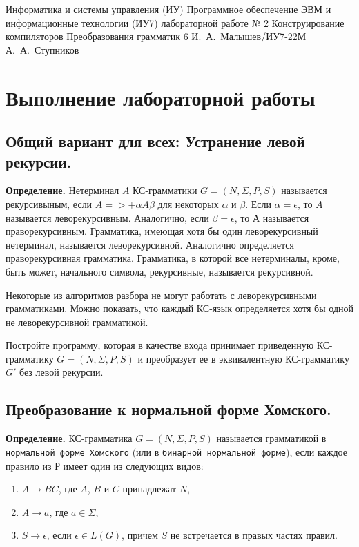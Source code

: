\documentclass[a4paper]{bmstu}
\begin{document}
\makereporttitle
{Информатика и системы управления (ИУ)}
{Программное обеспечение ЭВМ и информационные технологии (ИУ7)}
{лабораторной работе № 2}
{Конструирование компиляторов}
{Преобразования грамматик}
{6}
{И.~А.~Малышев/ИУ7-22М}
{А.~А.~Ступников}


\setcounter{page}{2}


\chapter{Выполнение лабораторной работы}

\section{Общий вариант для всех: Устранение левой рекурсии.}

\textbf{Определение.} Нетерминал $A$ КС-грамматики $G = (N, \Sigma, P, S)$ называется рекурсивыным, если $A =>+ \alpha A \beta$ для некоторых $\alpha$ и $\beta$. Если $\alpha = \epsilon$, то $A$ называется леворекурсивным. Аналогично, если $\beta = \epsilon$, то $А$ называется праворекурсивным. Грамматика, имеющая хотя бы один леворекурсивный нетерминал, называется леворекурсивной. Аналогично определяется праворекурсивная грамматика. Грамматика, в которой все нетерминалы, кроме, быть может, начального символа, рекурсивные, называется рекурсивной.

Некоторые из алгоритмов разбора не могут работать с леворекурсивными грамматиками. Можно показать, что каждый КС-язык определяется хотя бы одной не леворекурсивной грамматикой.

Постройте программу, которая в качестве входа принимает приведенную КС-грамматику $G = (N, \Sigma, P, S)$ и преобразует ее в эквивалентную КС-грамматику $G'$ без левой рекурсии.

\section{Преобразование к нормальной форме Хомского.}

\textbf{Определение.} КС-грамматика $G = (N, \Sigma, P, S)$ называется грамматикой в \texttt{нормальной форме Хомского} (или в \texttt{бинарной нормальной форме}), если каждое правило из $Р$ имеет один из следующих видов:
\begin{enumerate}
    \item $A \rightarrow BC$, где $A$, $B$ и $C$ принадлежат $N$,
    \item $A \rightarrow a$, где $a \in \Sigma$,
    \item $S \rightarrow \epsilon$, если $\epsilon \in L(G)$, причем $S$ не встречается в правых частях правил.
\end{enumerate}
\end{document}

